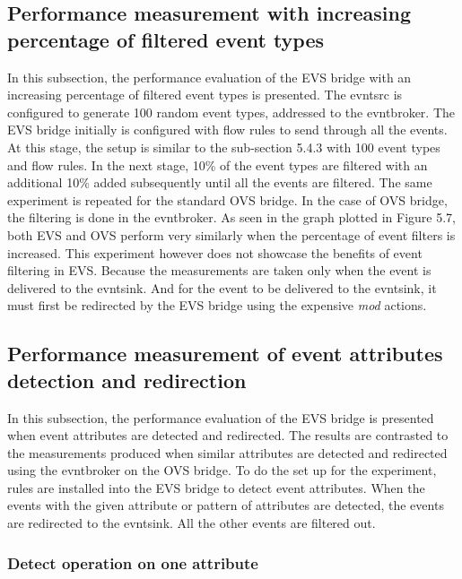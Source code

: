 \subsection{Performance measurement with increasing percentage of filtered event types}
In this subsection, the performance evaluation of the EVS bridge with an increasing percentage of filtered event types is presented. The evntsrc is configured to generate 100 random event types, addressed to the evntbroker. The EVS bridge initially is configured with flow rules to send through all the events. At this stage, the setup is similar to the sub-section 5.4.3 with 100 event types and flow rules. In the next stage, 10\% of the event types are filtered with an additional 10\% added subsequently until all the events are filtered. The same experiment is repeated for the standard OVS bridge. In the case of OVS bridge, the filtering is done in the evntbroker. 
\newline
As seen in the graph plotted in Figure 5.7, both EVS and OVS perform very similarly when the percentage of event filters is increased. This experiment however does not showcase the benefits of event filtering in EVS. Because the measurements are taken only when the event is delivered to the evntsink. And for the event to be delivered to the evntsink, it must first be redirected by the EVS bridge using the expensive \textit{mod} actions. 





\subsection{Performance measurement of event attributes detection and redirection}
In this subsection, the performance evaluation of the EVS bridge is presented when event attributes are detected and redirected. The results are contrasted to the measurements produced when similar attributes are detected and redirected using the evntbroker on the OVS bridge. To do the set up for the experiment, rules are installed into the EVS bridge to detect event attributes. When the events with the given attribute or pattern of attributes are detected, the events are redirected to the evntsink. All the other events are filtered out. 

\subsubsection{Detect operation on one attribute}

